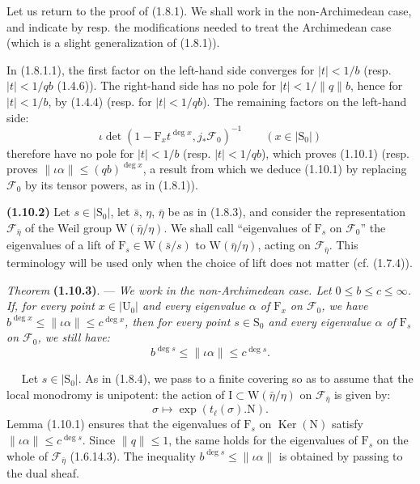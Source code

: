 \documentclass[11pt,leqno]{article}
\newcommand{\Page}[1]{\ifvmode\noindent\else\unskip\ \fi{\footnotesize\textcolor{gray}{[p.\,#1]}}\ \ignorespaces}
\begin{document}
Let us return to the proof of (1.8.1). We shall work in the non-Archimedean case, and indicate by resp. the modifications needed to treat the Archimedean case (which is a slight generalization of (1.8.1)).

In (1.8.1.1), the first factor on the left-hand side converges for \(\lvert t\rvert<1/b\) (resp. \(\lvert t\rvert<1/qb\) (1.4.6)). The right-hand side has no pole for \(\lvert t\rvert<1/\lVert q\rVert b\), hence for \(\lvert t\rvert<1/b\), by (1.4.4) (resp. for \(\lvert t\rvert<1/qb\)). The remaining factors on the left-hand side:
\[
\iota\det(1-\mathrm{F}_xt^{\deg x},j_*\mathscr{F}_0)^{-1}
\qquad (x\in\lvert\mathrm{S}_0\rvert)
\]
therefore have no pole for \(\lvert t\rvert<1/b\) (resp. \(\lvert t\rvert<1/qb\)), which proves (1.10.1) (resp. proves \(\lVert\iota\alpha\rVert\leq(qb)^{\deg x}\), a result from which we deduce (1.10.1) by replacing \(\mathscr{F}_0\) by its tensor powers, as in (1.8.1)).

\textbf{(1.10.2)} Let \(s\in\lvert\mathrm{S}_0\rvert\), let \(\bar{s}\), \(\eta\), \(\bar{\eta}\) be as in (1.8.3), and consider the representation \(\mathscr{F}_{\bar{\eta}}\) of the Weil group \(\mathrm{W}(\bar{\eta}/\eta)\). We shall call “eigenvalues of \(\mathrm{F}_s\) on \(\mathscr{F}_0\)” the eigenvalues of a lift of \(\mathrm{F}_s\in\mathrm{W}(\bar{s}/s)\) to \(\mathrm{W}(\bar{\eta}/\eta)\), acting on \(\mathscr{F}_{\bar{\eta}}\). This terminology will be used only when the choice of lift does not matter (cf. (1.7.4)).

\textit{Theorem} \textbf{(1.10.3)}. — \textit{We work in the non-Archimedean case. Let \(0\leq b\leq c\leq\infty\). If, for every point \(x\in\lvert\mathrm{U}_0\rvert\) and every eigenvalue \(\alpha\) of \(\mathrm{F}_x\) on \(\mathscr{F}_0\), we have \(b^{\deg x}\leq\lVert\iota\alpha\rVert\leq c^{\deg x}\), then for every point \(s\in\mathrm{S}_0\) and every eigenvalue \(\alpha\) of \(\mathrm{F}_s\) on \(\mathscr{F}_0\), we still have:}
\[
b^{\deg s}\leq\lVert\iota\alpha\rVert\leq c^{\deg s}.
\]

\Page{183}
Let \(s\in\lvert\mathrm{S}_0\rvert\). As in (1.8.4), we pass to a finite covering so as to assume that the local monodromy is unipotent: the action of \(\mathrm{I}\subset\mathrm{W}(\bar{\eta}/\eta)\) on \(\mathscr{F}_{\bar{\eta}}\) is given by:
\[
\sigma\mapsto\exp(t_\ell(\sigma).\mathrm{N}).
\]
Lemma (1.10.1) ensures that the eigenvalues of \(\mathrm{F}_s\) on \(\operatorname{Ker}(\mathrm{N})\) satisfy \(\lVert\iota\alpha\rVert\leq c^{\deg s}\). Since \(\lVert q\rVert\leq1\), the same holds for the eigenvalues of \(\mathrm{F}_s\) on the whole of \(\mathscr{F}_{\bar{\eta}}\) (1.6.14.3). The inequality \(b^{\deg s}\leq\lVert\iota\alpha\rVert\) is obtained by passing to the dual sheaf.
\end{document}
